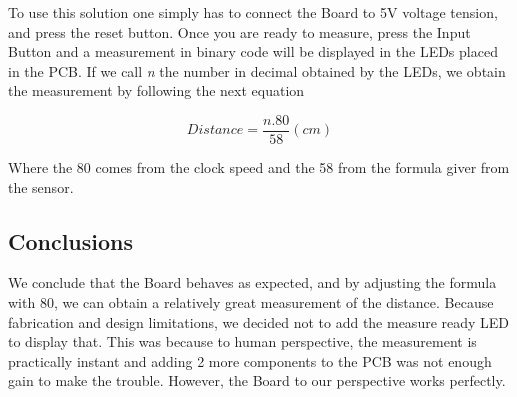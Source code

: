 To use this solution one simply has to connect the Board to 5V voltage
tension, and press the reset button. Once you are ready to measure,
press the Input Button and a measurement in binary code will be displayed
in the LEDs placed in the PCB. If we call \emph{n} the number in decimal
obtained by the LEDs, we obtain the measurement by following the next
equation

\[
Distance=\frac{n.80}{58}(cm)
\]

Where the 80 comes from the clock speed and the 58 from the formula
giver from the sensor.

\subsection{Conclusions}

We conclude that the Board behaves as expected, and by adjusting the
formula with 80, we can obtain a relatively great measurement of the
distance. Because fabrication and design limitations, we decided not
to add the measure ready LED to display that. This was because to
human perspective, the measurement is practically instant and adding
2 more components to the PCB was not enough gain to make the trouble.
However, the Board to our perspective works perfectly.
